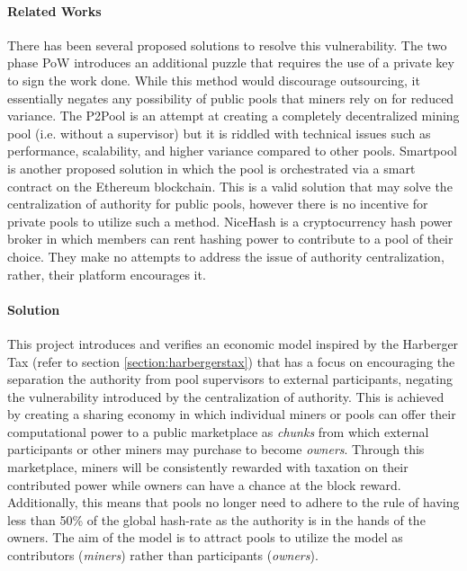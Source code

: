 \paragraph{Related Works} There has been several proposed solutions to resolve this vulnerability. The two phase PoW \cite{bastiaan2015} introduces an additional puzzle that requires the use of a private key to sign the work done. While this method would discourage outsourcing, it essentially negates any possibility of public pools that miners rely on for reduced variance. The P2Pool is an attempt at creating a completely decentralized mining pool (i.e. without a supervisor) but it is riddled with technical issues such as performance, scalability, and higher variance compared to other pools. Smartpool \cite{smartpool2017} is another proposed solution in which the pool is orchestrated via a smart contract on the Ethereum blockchain. This is a valid solution that may solve the centralization of authority for public pools, however there is no incentive for private pools to utilize such a method. NiceHash is a cryptocurrency hash power broker in which members can rent hashing power to contribute to a pool of their choice. They make no attempts to address the issue of authority centralization, rather, their platform encourages it.


\paragraph{Solution} This project introduces and verifies an economic model inspired by the Harberger Tax \cite{posnerweyl2017} (refer to section \ref{section:harbergerstax}) that has a focus on encouraging the separation the authority from pool supervisors to external participants, negating the vulnerability introduced by the centralization of authority. This is achieved by creating a sharing economy in which individual miners or pools can offer their computational power to a public marketplace as \textit{chunks} from which external participants or other miners may purchase to become \textit{owners}. Through this marketplace, miners will be consistently rewarded with taxation on their contributed power while owners can have a chance at the block reward. Additionally, this means that pools no longer need to adhere to the rule of having less than 50\% of the global hash-rate as the authority is in the hands of the owners. The aim of the model is to attract pools to utilize the model as contributors (\textit{miners}) rather than participants (\textit{owners}). 

